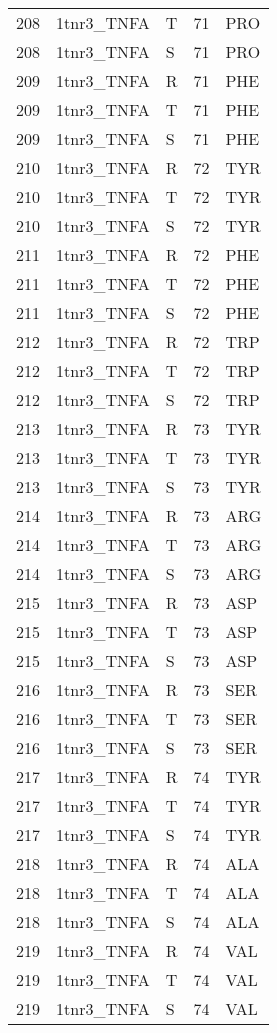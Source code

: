 \begin{longtable}[l]{l|l|l|l|l}
	208 & 1tnr3_TNFA & T & 71 & PRO \\
	208 & 1tnr3_TNFA & S & 71 & PRO \\
	209 & 1tnr3_TNFA & R & 71 & PHE \\
	209 & 1tnr3_TNFA & T & 71 & PHE \\
	209 & 1tnr3_TNFA & S & 71 & PHE \\
	210 & 1tnr3_TNFA & R & 72 & TYR \\
	210 & 1tnr3_TNFA & T & 72 & TYR \\
	210 & 1tnr3_TNFA & S & 72 & TYR \\
	211 & 1tnr3_TNFA & R & 72 & PHE \\
	211 & 1tnr3_TNFA & T & 72 & PHE \\
	211 & 1tnr3_TNFA & S & 72 & PHE \\
	212 & 1tnr3_TNFA & R & 72 & TRP \\
	212 & 1tnr3_TNFA & T & 72 & TRP \\
	212 & 1tnr3_TNFA & S & 72 & TRP \\
	213 & 1tnr3_TNFA & R & 73 & TYR \\
	213 & 1tnr3_TNFA & T & 73 & TYR \\
	213 & 1tnr3_TNFA & S & 73 & TYR \\
	214 & 1tnr3_TNFA & R & 73 & ARG \\
	214 & 1tnr3_TNFA & T & 73 & ARG \\
	214 & 1tnr3_TNFA & S & 73 & ARG \\
	215 & 1tnr3_TNFA & R & 73 & ASP \\
	215 & 1tnr3_TNFA & T & 73 & ASP \\
	215 & 1tnr3_TNFA & S & 73 & ASP \\
	216 & 1tnr3_TNFA & R & 73 & SER \\
	216 & 1tnr3_TNFA & T & 73 & SER \\
	216 & 1tnr3_TNFA & S & 73 & SER \\
	217 & 1tnr3_TNFA & R & 74 & TYR \\
	217 & 1tnr3_TNFA & T & 74 & TYR \\
	217 & 1tnr3_TNFA & S & 74 & TYR \\
	218 & 1tnr3_TNFA & R & 74 & ALA \\
	218 & 1tnr3_TNFA & T & 74 & ALA \\
	218 & 1tnr3_TNFA & S & 74 & ALA \\
	219 & 1tnr3_TNFA & R & 74 & VAL \\
	219 & 1tnr3_TNFA & T & 74 & VAL \\
	219 & 1tnr3_TNFA & S & 74 & VAL \\

\end{longtable}
